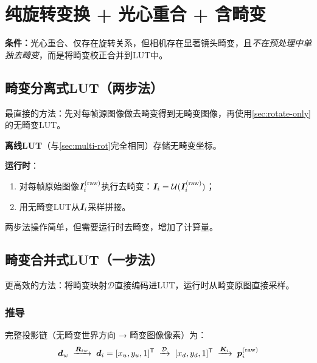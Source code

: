 \section{纯旋转变换 + 光心重合 + 含畸变}
\label{sec:rotate-distort}

\textbf{条件：}光心重合、仅存在旋转关系，但相机存在显著镜头畸变，且\emph{不在预处理中单独去畸变}，而是将畸变校正合并到LUT中。

\subsection{畸变分离式LUT（两步法）}
\label{sec:two-step}

最直接的方法：先对每帧源图像做去畸变得到无畸变图像，再使用\cref{sec:rotate-only}的无畸变LUT。

\begin{resultbox}[两步法流程]
\textbf{离线LUT}（与\cref{sec:multi-rot}完全相同）存储无畸变坐标。

\textbf{运行时}：
\begin{enumerate}[leftmargin=*]
  \item 对每帧原始图像$\bm{I}_i^{\text{(raw)}}$执行去畸变：$\bm{I}_i = \mathcal{U}(\bm{I}_i^{\text{(raw)}})$；
  \item 用无畸变LUT从$\bm{I}_i$采样拼接。
\end{enumerate}
\end{resultbox}

两步法操作简单，但需要运行时去畸变，增加了计算量。

\subsection{畸变合并式LUT（一步法）}
\label{sec:one-step}

更高效的方法：将畸变映射$\mathcal{D}$直接编码进LUT，运行时从畸变原图直接采样。

\subsubsection{推导}

完整投影链（无畸变世界方向 → 畸变图像像素）为：
\begin{equation}
\bm{d}_w \;\xrightarrow{\bm{R}_{iw}}\; \bm{d}_i = [x_u, y_u, 1]^{\mathsf{T}}
\;\xrightarrow{\mathcal{D}}\; [x_d, y_d, 1]^{\mathsf{T}}
\;\xrightarrow{\bm{K}_i}\; \bm{p}_i^{\text{(raw)}}
\label{eq:full-chain}
\end{equation}

